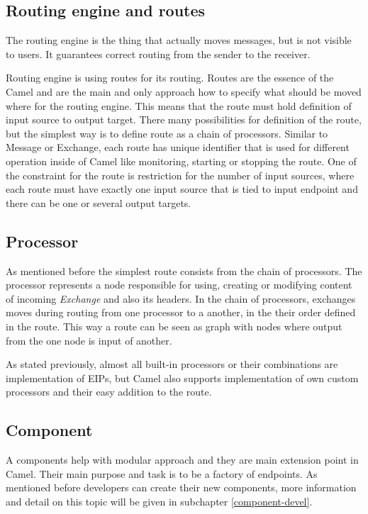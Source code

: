\documentclass[12pt,final,oneside]{fithesis2}
\begin{document}
\subsection*{Routing engine and routes}
The routing engine is the thing that actually moves messages, but is not visible to users. It guarantees correct routing from the sender to the receiver.

Routing engine is using routes for its routing. Routes are the essence of the Camel and are the main and only approach how to specify what should be moved where for the routing engine. This means that the route must hold definition of input source to output target. There many possibilities for definition of the route, but the simplest way is to define route as a chain of processors\cite{camel-in-action}. Similar to Message or Exchange, each route has unique identifier that is used for different operation inside of Camel like monitoring, starting or stopping the route. One of the constraint for the route is restriction for the number of input sources, where each route must have exactly one input source that is tied to input endpoint and there can be one or several output targets.

\subsection*{Processor}
As mentioned before the simplest route consists from the chain of processors. The processor represents a node responsible for using, creating or modifying content of incoming \textit{Exchange} and also its headers. In the chain of processors, exchanges moves during routing from one processor to a another, in the their order defined in the route. This way a route can be seen as graph with nodes where output from the one node is input of another.

As stated previously, almost all built-in processors or their combinations are implementation of EIPs, but Camel also supports implementation of own custom processors and their easy addition to the route.

\subsection*{Component}
A components help with modular approach and they are main extension point in Camel. Their main purpose and task is to be a factory of endpoints. As mentioned before developers can create their new components, more information and detail on this topic will be given in subchapter \ref{component-devel}. 
\end{document}
